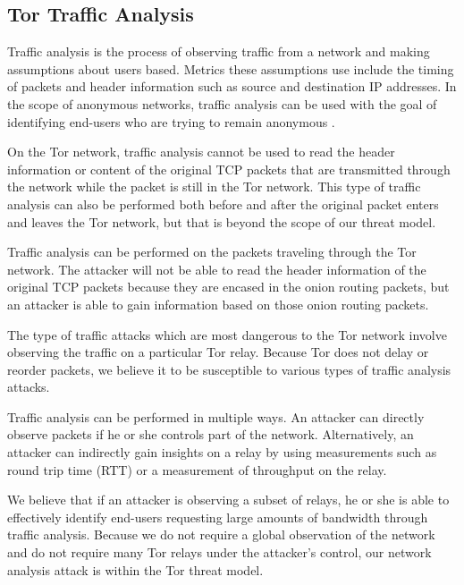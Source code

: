 \documentclass[12pt,journal]{IEEEtran}
\begin{document}
\subsection{Tor Traffic Analysis}
Traffic analysis is the process of observing traffic from a network and making assumptions about users based. Metrics these assumptions use include the timing of packets and header information such as source and destination IP addresses. In the scope of anonymous networks, traffic analysis can be used with the goal of identifying end-users who are trying to remain anonymous \cite{Murdoch:2005:LTA:1058433.1059390}.
\par
On the Tor network, traffic analysis cannot be used to read the header information or content of the original TCP packets that are transmitted through the network while the packet is still in the Tor network. This type of traffic analysis can also be performed both before and after the original packet enters and leaves the Tor network, but that is beyond the scope of our threat model.
\par
Traffic analysis can be performed on the packets traveling through the Tor network. The attacker will not be able to read the header information of the original TCP packets because they are encased in the onion routing packets, but an attacker is able to gain information based on those onion routing packets.
\par
The type of traffic attacks which are most dangerous to the Tor network involve observing the traffic on a particular Tor relay. Because Tor does not delay or reorder packets, we believe it to be susceptible to various types of traffic analysis attacks.
\par
Traffic analysis can be performed in multiple ways. An attacker can directly observe packets if he or she controls part of the network. Alternatively, an attacker can indirectly gain insights on a relay by using measurements such as round trip time (RTT) or a measurement of throughput on the relay.
\par
We believe that if an attacker is observing a subset of relays, he or she is able to effectively identify end-users requesting large amounts of bandwidth through traffic analysis. Because we do not require a global observation of the network and do not require many Tor relays under the attacker’s control, our network analysis attack is within the Tor threat model.
\end{document}

